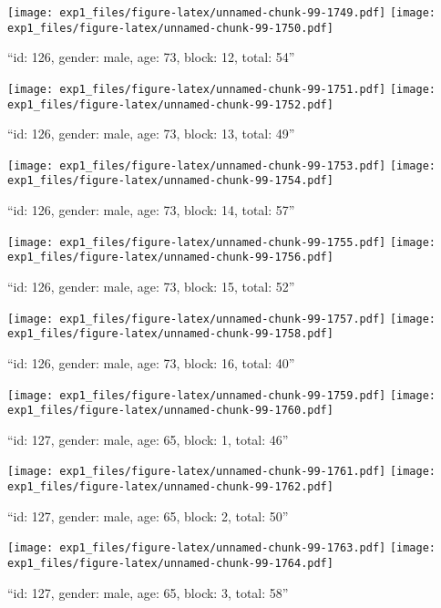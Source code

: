 \documentclass[,]{article}
\begin{document}
\texttt{[image: exp1\_files/figure-latex/unnamed-chunk-99-1749.pdf]}
\texttt{[image: exp1\_files/figure-latex/unnamed-chunk-99-1750.pdf]}

\newpage
[1] 

``id: 126, gender: male, age: 73, block: 12, total: 54''

\texttt{[image: exp1\_files/figure-latex/unnamed-chunk-99-1751.pdf]}
\texttt{[image: exp1\_files/figure-latex/unnamed-chunk-99-1752.pdf]}

\newpage
[1] 

``id: 126, gender: male, age: 73, block: 13, total: 49''

\texttt{[image: exp1\_files/figure-latex/unnamed-chunk-99-1753.pdf]}
\texttt{[image: exp1\_files/figure-latex/unnamed-chunk-99-1754.pdf]}

\newpage
[1] 

``id: 126, gender: male, age: 73, block: 14, total: 57''

\texttt{[image: exp1\_files/figure-latex/unnamed-chunk-99-1755.pdf]}
\texttt{[image: exp1\_files/figure-latex/unnamed-chunk-99-1756.pdf]}

\newpage
[1] 

``id: 126, gender: male, age: 73, block: 15, total: 52''

\texttt{[image: exp1\_files/figure-latex/unnamed-chunk-99-1757.pdf]}
\texttt{[image: exp1\_files/figure-latex/unnamed-chunk-99-1758.pdf]}

\newpage
[1] 

``id: 126, gender: male, age: 73, block: 16, total: 40''

\texttt{[image: exp1\_files/figure-latex/unnamed-chunk-99-1759.pdf]}
\texttt{[image: exp1\_files/figure-latex/unnamed-chunk-99-1760.pdf]}

\newpage
[1] 

``id: 127, gender: male, age: 65, block: 1, total: 46''

\texttt{[image: exp1\_files/figure-latex/unnamed-chunk-99-1761.pdf]}
\texttt{[image: exp1\_files/figure-latex/unnamed-chunk-99-1762.pdf]}

\newpage
[1] 

``id: 127, gender: male, age: 65, block: 2, total: 50''

\texttt{[image: exp1\_files/figure-latex/unnamed-chunk-99-1763.pdf]}
\texttt{[image: exp1\_files/figure-latex/unnamed-chunk-99-1764.pdf]}

\newpage
[1] 

``id: 127, gender: male, age: 65, block: 3, total: 58''
\end{document}

